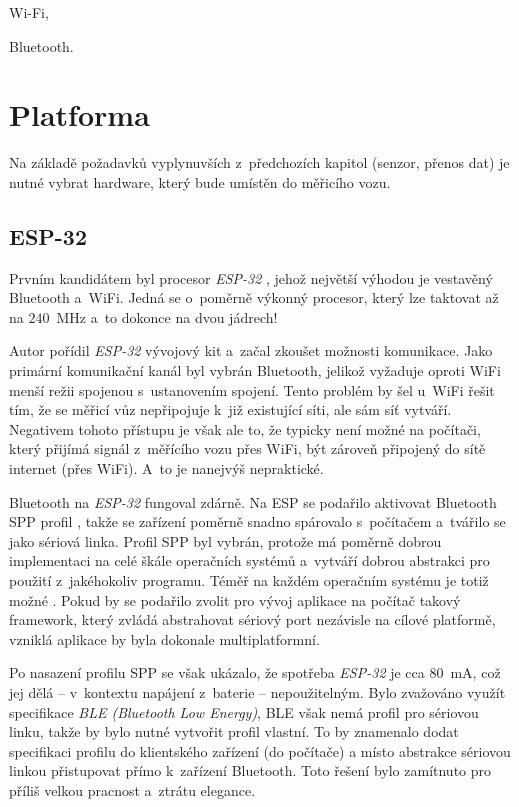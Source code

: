 \begin{compactenum}
\item Wi-Fi,
\item Bluetooth.
\end{compactenum}

\section{Platforma}
\label{sec:wsm-platforma}

Na základě požadavků vyplynuvších z~předchozích kapitol (senzor, přenos dat)
je nutné vybrat hardware, který bude umístěn do měřicího vozu.

\subsection{ESP-32}
\label{subsec:wsm-esp32}

Prvním kandidátem byl procesor \textit{ESP-32} \cite{esp-32}, jehož největší
výhodou je vestavěný Bluetooth a~WiFi. Jedná se o~poměrně výkonný procesor,
který lze taktovat až na $240$~MHz a~to dokonce na dvou jádrech!
\cite{esp-32:datasheet}

Autor pořídil \textit{ESP-32} vývojový kit a~začal zkoušet možnosti komunikace. Jako
primární komunikační kanál byl vybrán Bluetooth, jelikož vyžaduje oproti WiFi
menší režii spojenou s~ustanovením spojení. Tento problém by šel u~WiFi řešit
tím, že se měřicí vůz nepřipojuje k~již existující síti, ale sám síť vytváří.
Negativem tohoto přístupu je však ale to, že typicky není možné na počítači,
který přijímá signál z~měřícího vozu přes WiFi, být zároveň připojený do sítě
internet (přes WiFi). A~to je nanejvýš nepraktické.

Bluetooth na \textit{ESP-32} fungoval zdárně. Na ESP se podařilo aktivovat Bluetooth SPP
profil \cite{spp:specs}, takže se zařízení poměrně snadno spárovalo s~počítačem
a~tvářilo se jako sériová linka. Profil SPP byl vybrán, protože má
poměrně dobrou implementaci na celé škále operačních systémů a~vytváří dobrou
abstrakci pro použití z~jakéhokoliv programu. Téměř na každém operačním systému
je totiž možné . Pokud by se podařilo zvolit pro
vývoj aplikace na počítač takový framework, který zvládá abstrahovat sériový
port nezávisle na cílové platformě, vzniklá aplikace by byla dokonale
multiplatformní.

Po nasazení profilu SPP se však ukázalo, že spotřeba \textit{ESP-32} je cca $80$~mA,
což jej dělá -- v~kontextu napájení z~baterie -- nepoužitelným. Bylo zvažováno
využít specifikace \textit{BLE (Bluetooth Low Energy)}, BLE však nemá
profil pro sériovou linku, takže by bylo nutné vytvořit profil vlastní. To
by znamenalo dodat specifikaci profilu do klientského zařízení (do počítače)
a místo abstrakce sériovou linkou přistupovat přímo k~zařízení Bluetooth.
Toto řešení bylo zamítnuto pro příliš velkou pracnost a~ztrátu elegance.

